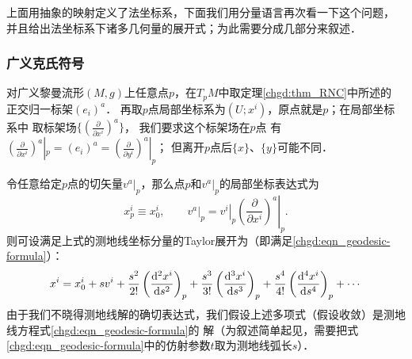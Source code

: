 



上面用抽象的映射定义了法坐标系，下面我们用分量语言再次看一下这个问题，
并且给出法坐标系下诸多几何量的展开式；为此需要分成几部分来叙述．

\subsubsection{广义克氏符号}
对广义黎曼流形$(M,g)$上任意点$p$，在$T_pM$中取定理\ref{chgd:thm_RNC}中所述的
正交归一标架$(e_i)^a$．
再取$p$点局部坐标系为$(U;x^i)$，原点就是$p$；在局部坐标系中
取标架场$\{(\frac{\partial}{\partial x^i})^a\}$，
我们要求这个标架场在$p$点
有$(\frac{\partial}{\partial x^i})^a|_p =(e_i)^a
=(\frac{\partial}{\partial y^i})^a|_p $；
但离开$p$点后$\{x\}$、$\{y\}$可能不同．


令任意给定$p$点的切矢量$v^a|_{p}$，那么点$p$和$v^a|_{p}$的局部坐标表达式为
\begin{equation}
    x_p^i\equiv x^i_0, \qquad v^a|_{p} = \left. v^i \right|_{p}
    \left. \left(\frac{\partial}{\partial x^i}\right)^a \right|_{p}.
\end{equation}
则可设满足上式的测地线坐标分量的Taylor展开为（即满足\eqref{chgd:eqn_geodesic-formula}）：
\begin{equation}\label{chgd:eqn_tmpgeodesic-expand}
    x^i = x^i_0 + s v^i  + \frac{s^2}{2!} \left(\frac{{\rm d}^2x^i}{{\rm d} s^2}\right)_{p}
     + \frac{s^3}{3!} \left(\frac{{\rm d}^3 x^i}{{\rm d} s^3}\right)_{p}
     + \frac{s^4}{4!} \left(\frac{{\rm d}^4 x^i}{{\rm d} s^4}\right)_{p}  + \cdots
\end{equation}
由于我们不晓得测地线解的确切表达式，我们假设上述多项式（假设收敛）是测地线方程式\eqref{chgd:eqn_geodesic-formula}的
解（为叙述简单起见，需要把式\eqref{chgd:eqn_geodesic-formula}中的仿射参数$t$取为测地线弧长$s$）．

